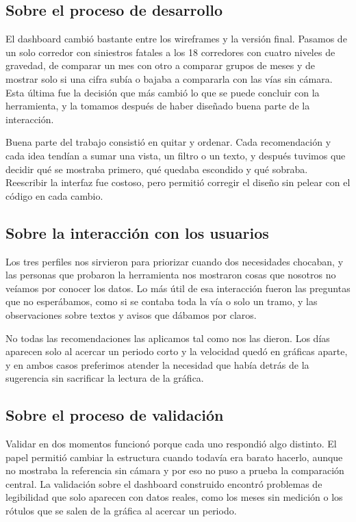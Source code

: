 \documentclass[10pt,a4paper]{article}
\begin{document}
\subsection{Sobre el proceso de desarrollo}

El dashboard cambió bastante entre los wireframes y la versión final. Pasamos de un solo corredor con siniestros fatales a los 18 corredores con cuatro niveles de gravedad, de comparar un mes con otro a comparar grupos de meses y de mostrar solo si una cifra subía o bajaba a compararla con las vías sin cámara. Esta última fue la decisión que más cambió lo que se puede concluir con la herramienta, y la tomamos después de haber diseñado buena parte de la interacción.

Buena parte del trabajo consistió en quitar y ordenar. Cada recomendación y cada idea tendían a sumar una vista, un filtro o un texto, y después tuvimos que decidir qué se mostraba primero, qué quedaba escondido y qué sobraba. Reescribir la interfaz fue costoso, pero permitió corregir el diseño sin pelear con el código en cada cambio.

\subsection{Sobre la interacción con los usuarios}

Los tres perfiles nos sirvieron para priorizar cuando dos necesidades chocaban, y las personas que probaron la herramienta nos mostraron cosas que nosotros no veíamos por conocer los datos. Lo más útil de esa interacción fueron las preguntas que no esperábamos, como si se contaba toda la vía o solo un tramo, y las observaciones sobre textos y avisos que dábamos por claros.

No todas las recomendaciones las aplicamos tal como nos las dieron. Los días aparecen solo al acercar un periodo corto y la velocidad quedó en gráficas aparte, y en ambos casos preferimos atender la necesidad que había detrás de la sugerencia sin sacrificar la lectura de la gráfica.

\subsection{Sobre el proceso de validación}

Validar en dos momentos funcionó porque cada uno respondió algo distinto. El papel permitió cambiar la estructura cuando todavía era barato hacerlo, aunque no mostraba la referencia sin cámara y por eso no puso a prueba la comparación central. La validación sobre el dashboard construido encontró problemas de legibilidad que solo aparecen con datos reales, como los meses sin medición o los rótulos que se salen de la gráfica al acercar un periodo.
\end{document}

